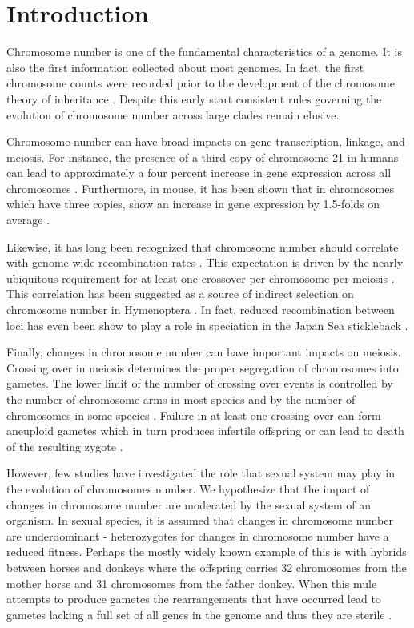 \section{Introduction}
Chromosome number is one of the fundamental characteristics of a genome.
It is also the first information collected about most genomes. 
In fact, the first chromosome counts were recorded prior to the development of the chromosome theory of inheritance \citep{flemming1882}.
Despite this early start consistent rules governing the evolution of chromosome number across large clades remain elusive. 

Chromosome number can have broad impacts on gene transcription, linkage, and meiosis. 
For instance, the presence of a third copy of chromosome 21 in humans can lead to approximately a four percent increase in gene expression across all chromosomes \citep{lockstone2007}. Furthermore, in mouse, it has been shown that in chromosomes which have three copies, show an increase in gene expression by 1.5-folds on average \citep{williams2008aneuploidy}. 

Likewise, it has long been recognized that chromosome number should correlate with genome wide recombination rates \citep{stebbins1958}.
This expectation is driven by the nearly ubiquitous requirement for at least one crossover per chromosome per meiosis \citep{dumont2017req}.
This correlation has been suggested as a source of indirect selection on chromosome number in Hymenoptera \citep{sherman1979,ross2015}.
In fact, reduced recombination between loci has even been show to play a role in speciation in the Japan Sea stickleback \citep{kitano2012}. 

Finally, changes in chromosome number can have important impacts on meiosis. 
Crossing over in meiosis determines the proper segregation of chromosomes into gametes.
The lower limit of the number of crossing over events is controlled by the number of chromosome arms in most species and by the number of chromosomes in some species \citep{dumont2017req}.
Failure in at least one crossing over can form aneuploid gametes which in turn produces infertile offspring or can lead to death of the resulting zygote \citep{hassold2001err}.

However, few studies have investigated the role that sexual system may play in the evolution of chromosomes number.  
We hypothesize that the impact of changes in chromosome number are moderated by the sexual system of an organism. 
In sexual species, it is assumed that changes in chromosome number are underdominant \citep{white1973} - heterozygotes for changes in chromosome number have a reduced fitness. 
Perhaps the mostly widely known example of this is with hybrids between horses and donkeys where the offspring carries 32 chromosomes from the mother horse and 31 chromosomes from the father donkey. 
When this mule attempts to produce gametes the rearrangements that have occurred lead to gametes lacking a full set of all genes in the genome and thus they are sterile \citep{wodsedalek1916}. 

